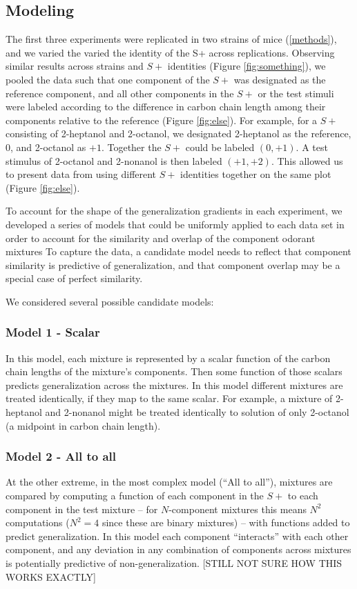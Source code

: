 \subsection{Modeling}

The first three experiments were replicated in two strains of mice (\ref{methods}), and we varied the varied the identity of the S+ across replications.  Observing similar results across strains and $S+$ identities (Figure \ref{fig:something}), we pooled the data such that one component of the $S+$ was designated as the reference component, and all other components in the $S+$ or the test stimuli were labeled according to the difference in carbon chain length among their components relative to the reference (Figure \ref{fig:else}).  For example, for a $S+$ consisting of 2-heptanol and 2-octanol, we designated 2-heptanol as the reference, $0$, and 2-octanol as $+1$.  Together the $S+$ could be labeled $(0,+1)$.  A test stimulus of 2-octanol and 2-nonanol is then labeled $(+1,+2)$.  This allowed us to present data from using different $S+$ identities together on the same plot (Figure \ref{fig:else}).  

To account for the shape of the generalization gradients in each experiment, we developed a series of models that could be uniformly applied to each data set in order to account for  the similarity and overlap of the component odorant mixtures  To capture the data, a candidate model needs to reflect that component similarity is predictive of generalization, and that component overlap may be a special case of perfect similarity.  

We considered several possible candidate models:

\subsubsection{Model 1 - Scalar}
In this model, each mixture is represented by a scalar function of the carbon chain lengths of the mixture’s components.  Then some function of those scalars predicts generalization across the mixtures.  In this model different mixtures are treated identically, if they map to the same scalar.  For example, a mixture of 2-heptanol and 2-nonanol might be treated identically to solution of only 2-octanol (a midpoint in carbon chain length).  

\subsubsection{Model 2 - All to all}
At the other extreme, in the most complex model (``All to all''), mixtures are compared by computing a function of each component in the $S+$ to each component in the test mixture -- for $N$-component mixtures this means $N^2$ computations ($N^2 = 4$ since these are binary mixtures) -- with functions added to predict generalization.  In this model each component ``interacts'' with each other component, and any deviation in any combination of components across mixtures is potentially predictive of non-generalization.  
[STILL NOT SURE HOW THIS WORKS EXACTLY]

